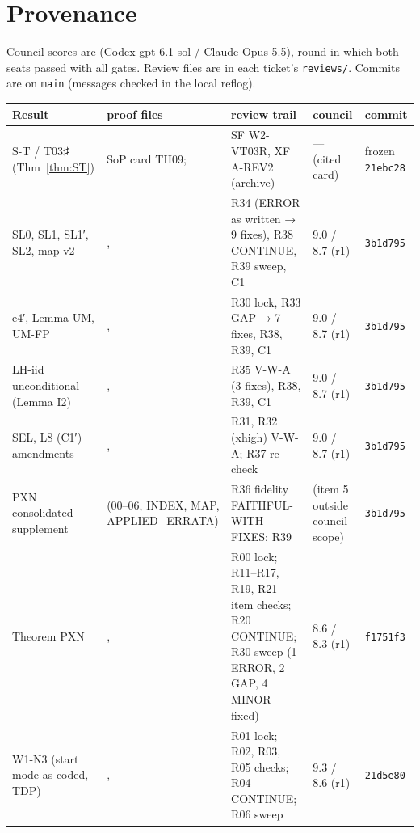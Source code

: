 \section{Provenance}\label{sec:prov}

Council scores are (Codex gpt-6.1-sol / Claude Opus 5.5), round in which both seats passed with all gates. Review files are in each ticket's \texttt{reviews/}. Commits are on \texttt{main} (messages checked in the local reflog).

{\footnotesize
\begin{xltabular}{\linewidth}{@{}p{2.5cm}p{3.6cm}Xp{1.5cm}p{1.1cm}@{}}
\toprule
Result & proof files & review trail & council & commit \\
\midrule
\endhead
S-T / T03♯ (Thm~\ref{thm:ST}) & SoP card TH09;  & SF W2-VT03R, XF A-REV2 (archive) & — (cited card) & frozen \texttt{21ebc28} \\
SL0, SL1, SL1′, SL2, map v2 & ,  & R34 (ERROR as written → 9 fixes), R38 CONTINUE, R39 sweep, C1 & 9.0 / 8.7 (r1) & \texttt{3b1d795} \\
e4′, Lemma UM, UM-FP & ,  & R30 lock, R33 GAP → 7 fixes, R38, R39, C1 & 9.0 / 8.7 (r1) & \texttt{3b1d795} \\
LH-iid unconditional (Lemma I2) & ,  & R35 V-W-A (3 fixes), R38, R39, C1 & 9.0 / 8.7 (r1) & \texttt{3b1d795} \\
SEL, L8 (C1′) amendments & ,  & R31, R32 (xhigh) V-W-A; R37 re-check & 9.0 / 8.7 (r1) & \texttt{3b1d795} \\
PXN consolidated supplement &  (00--06, INDEX, MAP, APPLIED\_ERRATA) & R36 fidelity FAITHFUL-WITH-FIXES; R39 & (item 5 outside council scope) & \texttt{3b1d795} \\
Theorem PXN & ,  & R00 lock; R11--R17, R19, R21 item checks; R20 CONTINUE; R30 sweep (1 ERROR, 2 GAP, 4 MINOR fixed) & 8.6 / 8.3 (r1) & \texttt{f1751f3} \\
W1-N3 (start mode as coded, TDP) & ,  & R01 lock; R02, R03, R05 checks; R04 CONTINUE; R06 sweep & 9.3 / 8.6 (r1) & \texttt{21d5e80} \\

\end{xltabular}}
